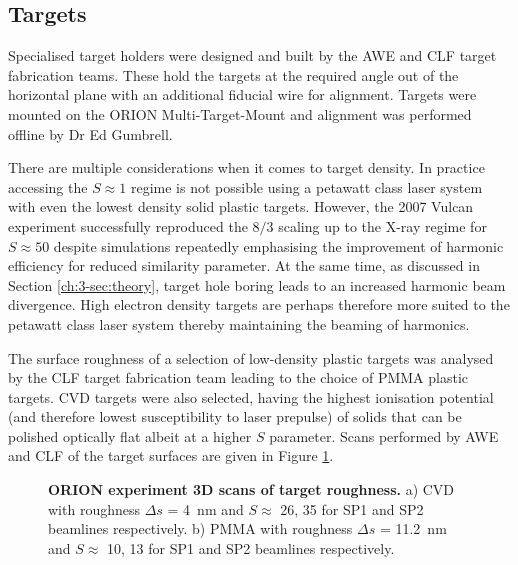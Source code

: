 

\subsection{Targets}
Specialised target holders were designed and built by the AWE and CLF target fabrication teams. These hold the targets at the required angle out of the horizontal plane with an additional fiducial wire for alignment. Targets were mounted on the ORION Multi-Target-Mount and alignment was performed offline by Dr Ed Gumbrell.

There are multiple considerations when it comes to target density. In practice accessing the $S\approx 1$ regime is not possible using a petawatt class laser system with even the lowest density solid plastic targets. However, the 2007 Vulcan experiment successfully reproduced the $8/3$ scaling up to the X-ray regime for $S \approx 50 $ \cite{dromeyBrightMultikeVHarmonic2007} despite simulations repeatedly emphasising the improvement of harmonic efficiency for reduced similarity parameter. At the same time, as discussed in Section \ref{ch:3-sec:theory}, target hole boring leads to an increased harmonic beam divergence. High electron density targets are perhaps therefore more suited to the petawatt class laser system thereby maintaining the beaming of harmonics.

The surface roughness of a selection of low-density plastic targets was analysed by the CLF target fabrication team leading to the choice of PMMA plastic targets. CVD targets were also selected, having the highest ionisation potential (and therefore lowest susceptibility to laser prepulse) of solids that can be polished optically flat albeit at a higher $S$ parameter. Scans performed by AWE and CLF of the target surfaces are given in Figure \ref{fig:oriontargets}.
\begin{figure}
	\centering
	\caption[ORION HHG experiment targets]{\textbf{ORION experiment 3D scans of target roughness.} a) CVD with roughness $\Delta s$ = \qty{4}{nm} and $S \approx$ 26, 35 for SP1 and SP2 beamlines respectively. b) PMMA with roughness $\Delta s$ = \qty{11.2}{nm} and $S \approx$ 10, 13 for SP1 and SP2 beamlines respectively.}
	\label{fig:oriontargets}
\end{figure}

